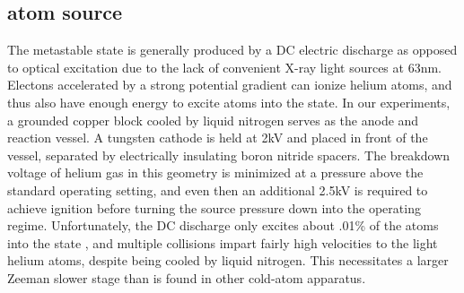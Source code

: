 
\subsection*{\mhe atom source}

	The metastable \mhe state is generally produced by a DC electric discharge as opposed to optical excitation due to the lack of convenient X-ray light sources at 63nm. Electons accelerated by a strong potential gradient can ionize helium atoms, and thus also have enough energy to excite atoms into the \mhe state. In our experiments, a grounded copper block cooled by liquid nitrogen serves as the anode and reaction vessel. A tungsten cathode is held at 2kV and placed in front of the vessel, separated by electrically insulating boron nitride spacers. The breakdown voltage of helium gas in this geometry is minimized at a pressure above the standard operating setting, and even then an additional 2.5kV is required to achieve ignition before turning the source pressure down into the operating regime. Unfortunately, the DC discharge only excites about .01\% of the atoms into the \mhe state \cite{stas06}, and multiple collisions impart fairly high velocities to the light helium atoms, despite being cooled by liquid nitrogen. This necessitates a larger Zeeman slower stage than is found in other cold-atom apparatus. 

